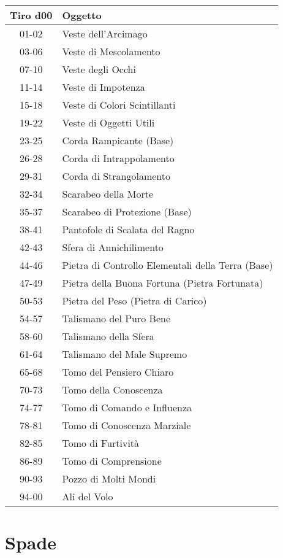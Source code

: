 \documentclass{article}
\begin{document}
\begin{multicols}{2}
\begin{tabular}{|c|l|}
\hline
\textbf{Tiro d00} & \textbf{Oggetto} \\
\hline
01-02 & Veste dell'Arcimago \\
03-06 & Veste di Mescolamento \\
07-10 & Veste degli Occhi \\
11-14 & Veste di Impotenza \\
15-18 & Veste di Colori Scintillanti \\
19-22 & Veste di Oggetti Utili \\
23-25 & Corda Rampicante (Base) \\
26-28 & Corda di Intrappolamento \\
29-31 & Corda di Strangolamento \\
32-34 & Scarabeo della Morte \\
35-37 & Scarabeo di Protezione (Base) \\
38-41 & Pantofole di Scalata del Ragno \\
42-43 & Sfera di Annichilimento \\
44-46 & Pietra di Controllo Elementali della Terra (Base) \\
47-49 & Pietra della Buona Fortuna (Pietra Fortunata) \\
50-53 & Pietra del Peso (Pietra di Carico) \\
54-57 & Talismano del Puro Bene \\
58-60 & Talismano della Sfera \\
61-64 & Talismano del Male Supremo \\
65-68 & Tomo del Pensiero Chiaro \\
70-73 & Tomo della Conoscenza \\
74-77 & Tomo di Comando e Influenza \\
78-81 & Tomo di Conoscenza Marziale \\
82-85 & Tomo di Furtività \\
86-89 & Tomo di Comprensione \\
90-93 & Pozzo di Molti Mondi \\
94-00 & Ali del Volo \\
\hline

\end{tabular}

\section{Spade}


\end{multicols}
\end{document}
